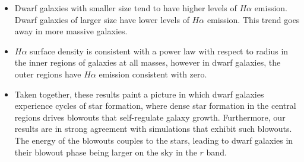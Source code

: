 \documentclass[iop]{emulateapj}
\begin{document}
\begin{itemize}
\item Dwarf galaxies with smaller size tend to have higher levels of $H\alpha$ emission. Dwarf galaxies of larger size have lower levels of $H\alpha$ emission. This trend goes away in more massive galaxies. 

\item $H\alpha$ surface density is consistent with a power law with respect to radius in the inner regions of galaxies at all masses, however in dwarf galaxies, the outer regions have $H\alpha$ emission consistent with zero.

\item Taken together, these results paint a picture in which dwarf galaxies experience cycles of star formation, where dense star formation in the central regions drives blowouts that self-regulate galaxy growth. Furthermore, our results are in strong agreement with simulations that exhibit such blowouts. The energy of the blowouts couples to the stars, leading to dwarf galaxies in their blowout phase being larger on the sky in the $r$ band.

\end{itemize}









\end{document}
